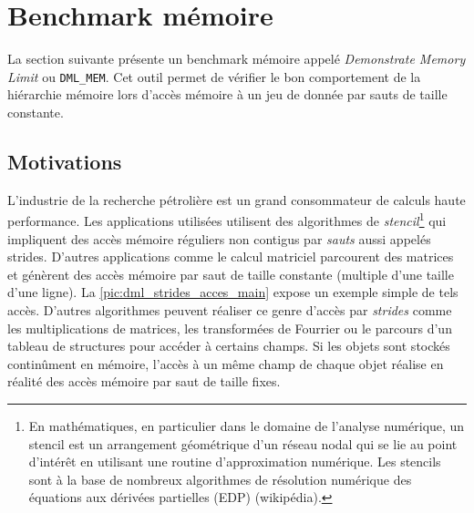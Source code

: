 \section{Benchmark mémoire}\label{sec:dmlmem}

    La section suivante présente un benchmark mémoire appelé \textit{Demonstrate Memory Limit} ou \verb=DML_MEM=. Cet outil permet de vérifier le bon comportement de la hiérarchie mémoire lors d'accès mémoire à un jeu de donnée par sauts de taille constante. 

    

    \subsection{Motivations}
    
        L'industrie de la recherche pétrolière est un grand consommateur de calculs haute performance. Les applications utilisées utilisent des algorithmes de \textit{stencil}\footnote{En mathématiques, en particulier dans le domaine de l'analyse numérique, un stencil est un arrangement géométrique d'un réseau nodal qui se lie au point d'intérêt en utilisant une routine d'approximation numérique. Les stencils sont à la base de nombreux algorithmes de résolution numérique des équations aux dérivées partielles (EDP) (wikipédia).} qui impliquent des accès mémoire réguliers non contigus par \textit{sauts} aussi appelés \glspl{stride}. D'autres applications comme le calcul matriciel parcourent des matrices et génèrent des accès mémoire par saut de taille constante (multiple d'une taille d'une ligne). La \autoref{pic:dml_strides_acces_main} expose un exemple simple de tels accès. D'autres algorithmes peuvent réaliser ce genre d'accès par \textit{strides} comme les multiplications de matrices, les transformées de Fourrier ou le parcours d'un tableau de structures pour accéder à certains champs. Si les objets sont stockés continûment en mémoire, l'accès à un même champ de chaque objet réalise en réalité des accès mémoire par saut de taille fixes. 
        
